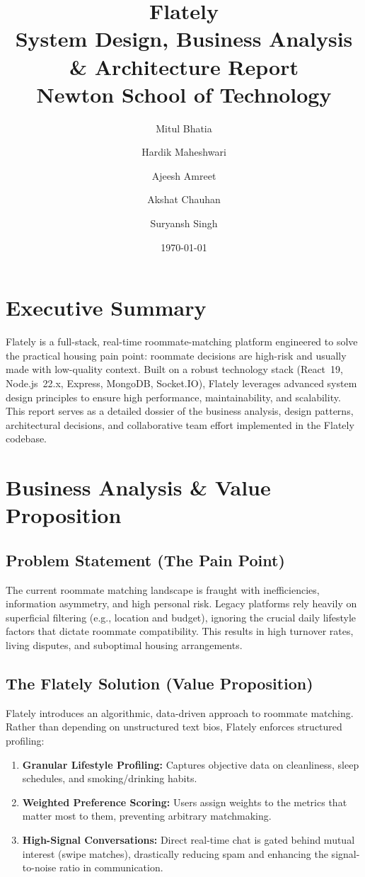 \documentclass[12pt,a4paper]{article}
\title{
    \vspace{2cm}
    \textbf{\Huge Flately}\\[0.5cm]
    \Large System Design, Business Analysis \& Architecture Report\\[1cm]
    \large \textbf{Newton School of Technology}\\
    \vspace{1cm}
}
\author{
    Mitul Bhatia \and Hardik Maheshwari \and Ajeesh Amreet \\ \and Akshat Chauhan \and Suryansh Singh
}
\date{\today}
\begin{document}
\maketitle
\thispagestyle{empty}
\newpage

\tableofcontents
\newpage

\section{Executive Summary}
Flately is a full-stack, real-time roommate-matching platform engineered to solve the practical housing pain point: roommate decisions are high-risk and usually made with low-quality context. Built on a robust technology stack (React~19, Node.js~22.x, Express, MongoDB, Socket.IO), Flately leverages advanced system design principles to ensure high performance, maintainability, and scalability. This report serves as a detailed dossier of the business analysis, design patterns, architectural decisions, and collaborative team effort implemented in the Flately codebase.

\section{Business Analysis \& Value Proposition}

\subsection{Problem Statement (The Pain Point)}
The current roommate matching landscape is fraught with inefficiencies, information asymmetry, and high personal risk. Legacy platforms rely heavily on superficial filtering (e.g., location and budget), ignoring the crucial daily lifestyle factors that dictate roommate compatibility. This results in high turnover rates, living disputes, and suboptimal housing arrangements.

\subsection{The Flately Solution (Value Proposition)}
Flately introduces an algorithmic, data-driven approach to roommate matching. Rather than depending on unstructured text bios, Flately enforces structured profiling:
\begin{enumerate}
    \item \textbf{Granular Lifestyle Profiling:} Captures objective data on cleanliness, sleep schedules, and smoking/drinking habits.
    \item \textbf{Weighted Preference Scoring:} Users assign weights to the metrics that matter most to them, preventing arbitrary matchmaking.
    \item \textbf{High-Signal Conversations:} Direct real-time chat is gated behind mutual interest (swipe matches), drastically reducing spam and enhancing the signal-to-noise ratio in communication.
\end{enumerate}
\end{document}
